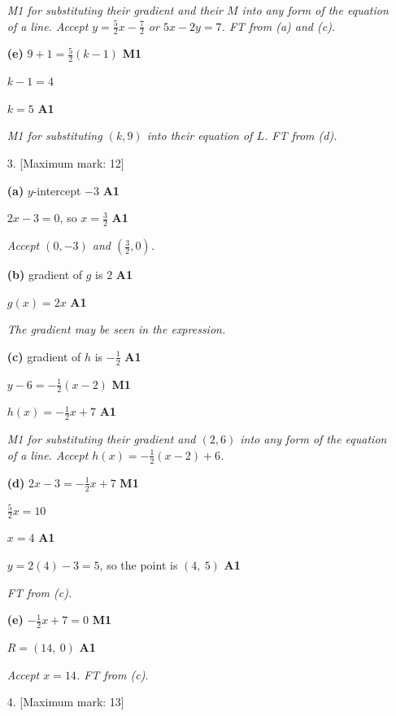 \documentclass[12pt, twoside]{article}
\begin{document}
\begin{enumerate}[itemsep=0.3cm]
\emph{M1 for substituting their gradient and their $M$ into any form of the
equation of a line. Accept $y = \frac{5}{2}x - \frac{7}{2}$ or $5x - 2y = 7$.
FT from (a) and (c).}

\textbf{(e)} $9 + 1 = \frac{5}{2}(k - 1)$ \hfill \textbf{M1}

$k - 1 = 4$

$k = 5$ \hfill \textbf{A1}

\emph{M1 for substituting $(k, 9)$ into their equation of $L$. FT from (d).}

\newpage

\item[3.] [Maximum mark: 12]

\textbf{(a)} $y$-intercept $-3$ \hfill \textbf{A1}

$2x - 3 = 0$, so $x = \frac{3}{2}$ \hfill \textbf{A1}

\emph{Accept $(0, -3)$ and $\left(\frac{3}{2}, 0\right)$.}

\textbf{(b)} gradient of $g$ is $2$ \hfill \textbf{A1}

$g(x) = 2x$ \hfill \textbf{A1}

\emph{The gradient may be seen in the expression.}

\textbf{(c)} gradient of $h$ is $-\frac{1}{2}$ \hfill \textbf{A1}

$y - 6 = -\frac{1}{2}(x - 2)$ \hfill \textbf{M1}

$h(x) = -\frac{1}{2}x + 7$ \hfill \textbf{A1}

\emph{M1 for substituting their gradient and $(2, 6)$ into any form of the
equation of a line. Accept $h(x) = -\frac{1}{2}(x - 2) + 6$.}

\textbf{(d)} $2x - 3 = -\frac{1}{2}x + 7$ \hfill \textbf{M1}

$\frac{5}{2}x = 10$

$x = 4$ \hfill \textbf{A1}

$y = 2(4) - 3 = 5$, so the point is $(4,\ 5)$ \hfill \textbf{A1}

\emph{FT from (c).}

\textbf{(e)} $-\frac{1}{2}x + 7 = 0$ \hfill \textbf{M1}

$R = (14,\ 0)$ \hfill \textbf{A1}

\emph{Accept $x = 14$. FT from (c).}

\newpage

\item[4.] [Maximum mark: 13]


\end{enumerate}
\end{document}
